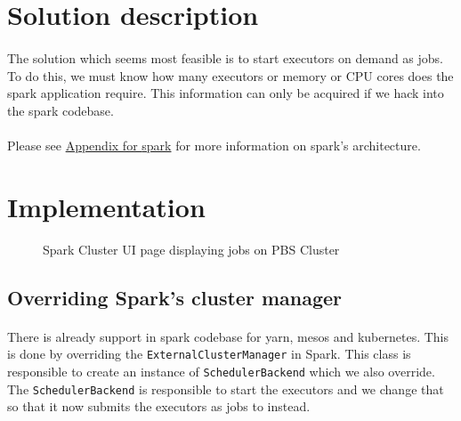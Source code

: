\section{Solution description}

\paragraph{}
The solution which seems most feasible is to start \glspl{executor} on
demand as  jobs. To do this, we must know how many executors or
memory or CPU cores does the spark application require. This information can
only be acquired if we hack into the \gls{spark} codebase.

\paragraph{}
Please see \hyperref[sec:appendix-spark]{Appendix for \gls{spark}} for more
information on \gls{spark}'s architecture.


\section{Implementation}

\begin{figure}[h]
    \centering
    \caption{Spark Cluster UI page displaying jobs on PBS Cluster}
\end{figure}

\subsection{Overriding Spark's cluster manager}
\paragraph{}
There is already support in \gls{spark} codebase for \gls{yarn}, \gls{mesos} and
\gls{kubernetes}. This is done by overriding the \texttt{ExternalClusterManager}
in Spark. This class is responsible to create an instance of
\texttt{SchedulerBackend} which we also override. The \texttt{SchedulerBackend}
is responsible to start the \glspl{executor} and we change that so that it
now submits the \glspl{executor} as jobs to  instead.

